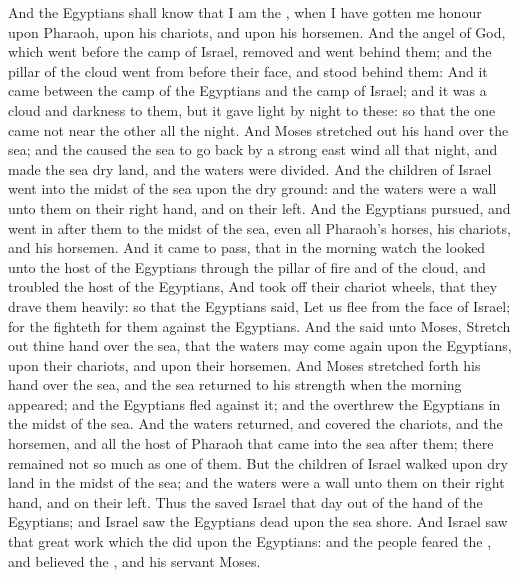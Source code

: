 \begin{biblechapter}
\verse And the Egyptians shall know that I am the \LORD, when I have gotten me honour upon Pharaoh, upon his chariots, and upon his horsemen.
\verse And the angel of God, which went before the camp of Israel, removed and went behind them; and the pillar of the cloud went from before their face, and stood behind them:
\verse And it came between the camp of the Egyptians and the camp of Israel; and it was a cloud and darkness to them, but it gave light by night to these: so that the one came not near the other all the night.
\verse And Moses stretched out his hand over the sea; and the \LORD caused the sea to go back by a strong east wind all that night, and made the sea dry land, and the waters were divided.
\verse And the children of Israel went into the midst of the sea upon the dry ground: and the waters were a wall unto them on their right hand, and on their left.
\verse And the Egyptians pursued, and went in after them to the midst of the sea, even all Pharaoh's horses, his chariots, and his horsemen.
\verse And it came to pass, that in the morning watch the \LORD looked unto the host of the Egyptians through the pillar of fire and of the cloud, and troubled the host of the Egyptians,
\verse And took off their chariot wheels, that they drave them heavily: so that the Egyptians said, Let us flee from the face of Israel; for the \LORD fighteth for them against the Egyptians.
\verse And the \LORD said unto Moses, Stretch out thine hand over the sea, that the waters may come again upon the Egyptians, upon their chariots, and upon their horsemen.
\verse And Moses stretched forth his hand over the sea, and the sea returned to his strength when the morning appeared; and the Egyptians fled against it; and the \LORD overthrew the Egyptians in the midst of the sea.
\verse And the waters returned, and covered the chariots, and the horsemen, and all the host of Pharaoh that came into the sea after them; there remained not so much as one of them.
\verse But the children of Israel walked upon dry land in the midst of the sea; and the waters were a wall unto them on their right hand, and on their left.
\verse Thus the \LORD saved Israel that day out of the hand of the Egyptians; and Israel saw the Egyptians dead upon the sea shore.
\verse And Israel saw that great work which the \LORD did upon the Egyptians: and the people feared the \LORD, and believed the \LORD, and his servant Moses.
\end{biblechapter}

